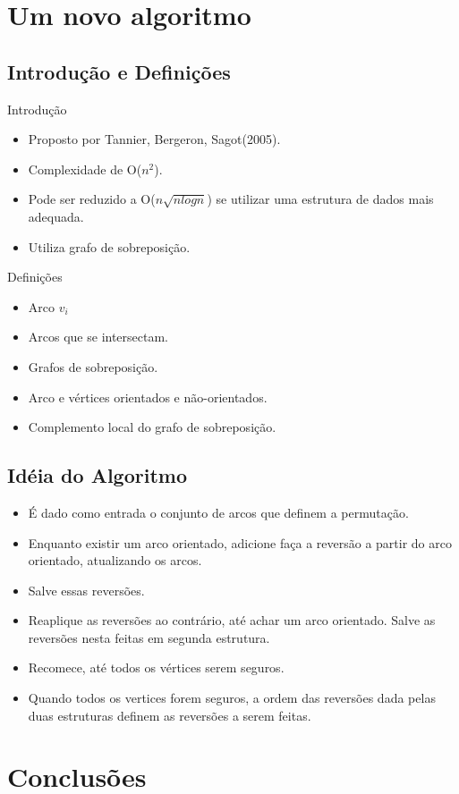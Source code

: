 \documentclass{beamer}
\begin{document}
\section{Um novo algoritmo}

\subsection{Introdução e Definições}

\begin{frame}{Introdução}
	\begin{itemize}
		\item Proposto por Tannier, Bergeron, Sagot(2005).
		\item Complexidade de O($n^{2}$).
		\pause \item Pode ser reduzido a O($n \sqrt{nlogn}$) se utilizar uma estrutura de dados mais adequada.
		\pause \item Utiliza grafo de sobreposição.
	\end{itemize}
\end{frame}

\begin{frame} {Definições}
	\begin{itemize}
		\item Arco $v_{i}$
		\item Arcos que se intersectam.
		\item Grafos de sobreposição.
		\item Arco e vértices orientados e não-orientados.
		\item Complemento local do grafo de sobreposição.
	\end{itemize}
\end{frame}

\subsection{Idéia do Algoritmo}

\begin{frame}
	\begin{itemize}
		\item É dado como entrada o conjunto de arcos que definem a permutação.
		\item Enquanto existir um arco orientado, adicione faça a reversão a partir do arco orientado, atualizando os arcos.
		\item Salve essas reversões.
		\item Reaplique as reversões ao contrário, até achar um arco orientado. Salve as reversões nesta feitas em segunda estrutura.
		\item Recomece, até todos os vértices serem seguros.
		\item Quando todos os vertices forem seguros, a ordem das reversões dada pelas duas estruturas definem as reversões a serem feitas.
	\end{itemize} 
\end{frame}

\section{Conclusões}

\begin{frame}

\end{frame}

\begin{frame}[plain]
  \titlepage
\end{frame}
\end{document}

